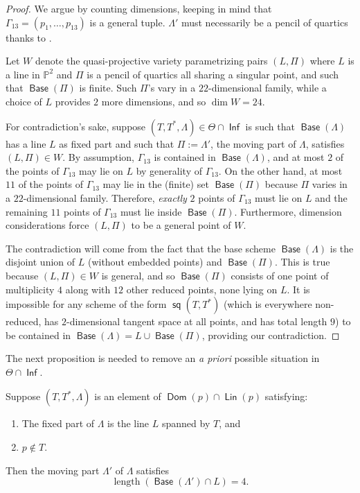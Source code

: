 \documentclass{article}
\renewcommand{\P}{\mathbb{P}}
\DeclareMathOperator{\s}{\mathsf{sq}}
\DeclareMathOperator{\Dom}{\mathsf{Dom}}
\DeclareMathOperator{\Inf}{\mathsf{Inf}}
\DeclareMathOperator{\Lin}{\mathsf{Lin}}
\DeclareMathOperator{\Base}{\mathsf{Base}}
\DeclareMathOperator{\length}{length}
\begin{document}
\begin{proof}
We argue by counting dimensions, keeping in mind that $\Gamma_{13} = (p_1, \dots, p_{13})$ is a general tuple. $\Lambda'$ must necessarily be a pencil of quartics thanks to .

Let $W$ denote the quasi-projective variety parametrizing pairs $(L,\Pi)$ where $L$ is a line in $\P^{2}$ and $\Pi$ is a pencil of quartics all sharing a singular point, and such that $\Base(\Pi)$ is finite. Such $\Pi$'s vary in a $22$-dimensional family, while a choice of $L$ provides $2$ more dimensions, and so $\dim W = 24$. 

For contradiction's sake, suppose $(T,T^{*},\Lambda) \in \Theta \cap \Inf$ is such that $\Base(\Lambda)$ has a line $L$ as fixed part and such that $\Pi := \Lambda'$, the moving part of $\Lambda$, satisfies $(L,\Pi) \in W$. By assumption, $\Gamma_{13}$ is contained in $\Base(\Lambda)$, and at most $2$ of the points of $\Gamma_{13}$ may lie on $L$ by generality of $\Gamma_{13}$.  On the other hand, at most $11$ of the points of $\Gamma_{13}$ may lie in the (finite) set $\Base(\Pi)$ because $\Pi$ varies in a $22$-dimensional family. Therefore, {\sl  exactly} $2$ points of $\Gamma_{13}$ must lie on $L$ and the remaining $11$ points of $\Gamma_{13}$ must lie inside $\Base(\Pi)$.  Furthermore, dimension considerations force $(L,\Pi)$ to be a general point of $W$. 

The contradiction will come from the fact that the base scheme $\Base (\Lambda)$ is the disjoint union of $L$ (without embedded points) and $\Base(\Pi)$. This is true because $(L,\Pi) \in W$ is general, and so  $\Base(\Pi)$ consists of one point of multiplicity $4$ along with $12$ other reduced points, none lying on $L$.  It is impossible for any scheme of the form $\s(T,T^{*})$ (which is everywhere non-reduced, has $2$-dimensional tangent space at all points, and has total length $9$) to be contained in $\Base(\Lambda) = L \cup \Base(\Pi)$, providing our contradiction.
\end{proof}

The next proposition is needed to remove an {\sl a priori} possible situation in $\Theta \cap \Inf$.

\begin{proposition}
\label{proposition:LinDom}
Suppose $(T,T^{*},\Lambda)$ is an element of  $\Dom(p) \cap \Lin(p)$ satisfying:
\begin{enumerate}
    \item The fixed part of $\Lambda$ is the line $L$ spanned by $T$, and
    \item $p \notin T$. 
\end{enumerate}
Then the moving part $\Lambda'$ of $\Lambda$ satisfies $$\length \left(\Base(\Lambda') \cap L\right) = 4.$$
\end{proposition}
\end{document}
